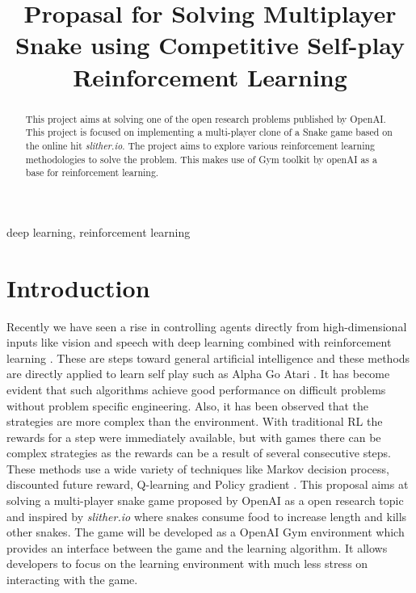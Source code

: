 \documentclass[conference]{IEEEtran}
\begin{document}
\title{Propasal for Solving Multiplayer Snake using Competitive Self-play Reinforcement Learning}

\author{
\and
{}
\and
{}
}

\maketitle

\begin{abstract}
This project aims at solving one of the open research problems published by OpenAI\cite{n3}. This project is focused on implementing a multi-player clone of a Snake game based on the online hit \textit{slither.io}. The project aims to explore various reinforcement learning methodologies to solve the problem. This makes use of Gym toolkit by openAI as a base for reinforcement learning.
\end{abstract}

\begin{IEEEkeywords}
deep learning, reinforcement learning
\end{IEEEkeywords}

\section{Introduction}
Recently we have seen a rise in controlling agents directly from
high-dimensional inputs like vision and speech with deep learning combined
with reinforcement learning \cite{sp3} \cite{sd5}. These are steps toward
general artificial intelligence and these methods are directly applied to
learn self play such as Alpha Go \cite{sp9} Atari \cite{sp3}. It has become
evident that such algorithms achieve good performance on difficult problems
without problem specific engineering. Also, it has been observed that the
strategies are more complex than the environment. With traditional RL the
rewards for a step were immediately available, but with games there can be
complex strategies as the rewards can be a result of several consecutive steps.
These methods use a wide variety of techniques like Markov decision process,
discounted future reward, Q-learning \cite{sd5} and Policy gradient \cite{sd4}.\break
This proposal aims at solving a multi-player snake game proposed by OpenAI as a open research topic and inspired by
\textit{slither.io} \cite{sd2} where snakes consume food to increase length and
kills other snakes. The game will be developed as a
OpenAI Gym \cite{sd2} environment which provides an interface between the game
and the learning algorithm. It allows developers to focus on the learning
environment with much less stress on interacting with the game.
\end{document}
